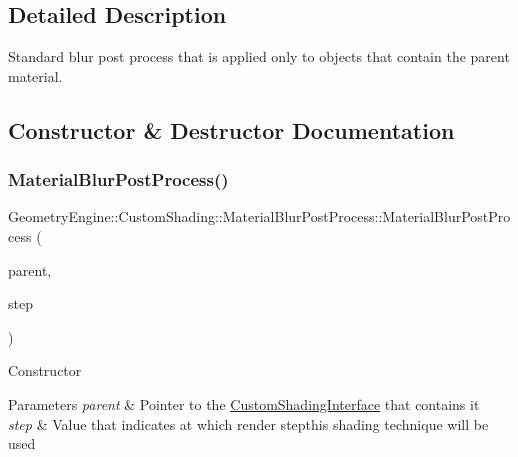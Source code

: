 \subsection{Detailed Description}
Standard blur post process that is applied only to objects that contain the parent material. 

\subsection{Constructor \& Destructor Documentation}
\mbox{\label{class_geometry_engine_1_1_custom_shading_1_1_material_blur_post_process_a1353d7855dd43ab08d3f68ab40e36dc0}} 
\subsubsection{\texorpdfstring{MaterialBlurPostProcess()}{MaterialBlurPostProcess()}\hspace{0.1cm}{\footnotesize\ttfamily [1/2]}}
{\footnotesize\ttfamily Geometry\+Engine\+::\+Custom\+Shading\+::\+Material\+Blur\+Post\+Process\+::\+Material\+Blur\+Post\+Process (\begin{DoxyParamCaption}\item[{\mbox{\hyperlink{class_geometry_engine_1_1_custom_shading_1_1_material_post_process_interface}{Material\+Post\+Process\+Interface}} $\ast$}]{parent,  }\item[{\mbox{\hyperlink{namespace_geometry_engine_1_1_custom_shading_af8b09b91ca7086f4f67a5d4181f35e58}{Material\+Post\+Process\+Steps}}}]{step }\end{DoxyParamCaption})\hspace{0.3cm}{\ttfamily [inline]}}

Constructor 
\begin{DoxyParams}{Parameters}
{\em parent} & Pointer to the \mbox{\hyperlink{class_geometry_engine_1_1_custom_shading_1_1_custom_shading_interface}{Custom\+Shading\+Interface}} that contains it \\
\hline
{\em step} & Value that indicates at which render stepthis shading technique will be used \\
\hline
\end{DoxyParams}
\mbox{\label{class_geometry_engine_1_1_custom_shading_1_1_material_blur_post_process_a5af24d3d39bcd22f85230471678faeaa}} 
